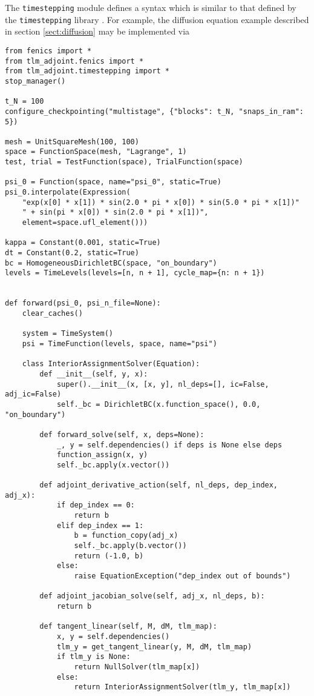 \documentclass[11pt]{article}
\begin{document}
The \texttt{timestepping} module defines a syntax which is similar to that
defined by the \texttt{timestepping} library \citep[see][]{maddison2014}. For
example, the diffusion equation example described in section
\ref{sect:diffusion} may be implemented via
\begin{lstlisting}
from fenics import *
from tlm_adjoint.fenics import *
from tlm_adjoint.timestepping import *
stop_manager()

t_N = 100
configure_checkpointing("multistage", {"blocks": t_N, "snaps_in_ram": 5})

mesh = UnitSquareMesh(100, 100)
space = FunctionSpace(mesh, "Lagrange", 1)
test, trial = TestFunction(space), TrialFunction(space)

psi_0 = Function(space, name="psi_0", static=True)
psi_0.interpolate(Expression(
    "exp(x[0] * x[1]) * sin(2.0 * pi * x[0]) * sin(5.0 * pi * x[1])"
    " + sin(pi * x[0]) * sin(2.0 * pi * x[1])",
    element=space.ufl_element()))

kappa = Constant(0.001, static=True)
dt = Constant(0.2, static=True)
bc = HomogeneousDirichletBC(space, "on_boundary")
levels = TimeLevels(levels=[n, n + 1], cycle_map={n: n + 1})


def forward(psi_0, psi_n_file=None):
    clear_caches()

    system = TimeSystem()
    psi = TimeFunction(levels, space, name="psi")

    class InteriorAssignmentSolver(Equation):
        def __init__(self, y, x):
            super().__init__(x, [x, y], nl_deps=[], ic=False, adj_ic=False)
            self._bc = DirichletBC(x.function_space(), 0.0, "on_boundary")

        def forward_solve(self, x, deps=None):
            _, y = self.dependencies() if deps is None else deps
            function_assign(x, y)
            self._bc.apply(x.vector())

        def adjoint_derivative_action(self, nl_deps, dep_index, adj_x):
            if dep_index == 0:
                return b
            elif dep_index == 1:
                b = function_copy(adj_x)
                self._bc.apply(b.vector())
                return (-1.0, b)
            else:
                raise EquationException("dep_index out of bounds")

        def adjoint_jacobian_solve(self, adj_x, nl_deps, b):
            return b

        def tangent_linear(self, M, dM, tlm_map):
            x, y = self.dependencies()
            tlm_y = get_tangent_linear(y, M, dM, tlm_map)
            if tlm_y is None:
                return NullSolver(tlm_map[x])
            else:
                return InteriorAssignmentSolver(tlm_y, tlm_map[x])


\end{lstlisting}
\end{document}
